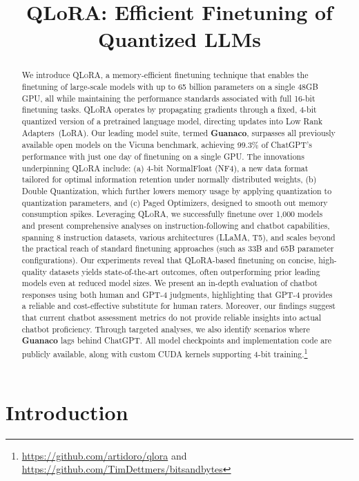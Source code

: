 \title{QLoRA: Efficient Finetuning of Quantized LLMs}

\begin{abstract}
We introduce \textsc{QLoRA}, a memory-efficient finetuning technique that enables the finetuning of large-scale models with up to 65 billion parameters on a single 48GB GPU, all while maintaining the performance standards associated with full 16-bit finetuning tasks. \textsc{QLoRA} operates by propagating gradients through a fixed, 4-bit quantized version of a pretrained language model, directing updates into Low Rank Adapters~(LoRA). Our leading model suite, termed \textbf{Guanaco}, surpasses all previously available open models on the Vicuna benchmark, achieving 99.3\% of ChatGPT’s performance with just one day of finetuning on a single GPU. The innovations underpinning \textsc{QLoRA} include: (a) 4-bit NormalFloat (NF4), a new data format tailored for optimal information retention under normally distributed weights, (b) Double Quantization, which further lowers memory usage by applying quantization to quantization parameters, and (c) Paged Optimizers, designed to smooth out memory consumption spikes. Leveraging \textsc{QLoRA}, we successfully finetune over 1,000 models and present comprehensive analyses on instruction-following and chatbot capabilities, spanning 8 instruction datasets, various architectures (LLaMA, T5), and scales beyond the practical reach of standard finetuning approaches (such as 33B and 65B parameter configurations). Our experiments reveal that QLoRA-based finetuning on concise, high-quality datasets yields state-of-the-art outcomes, often outperforming prior leading models even at reduced model sizes. We present an in-depth evaluation of chatbot responses using both human and GPT-4 judgments, highlighting that GPT-4 provides a reliable and cost-effective substitute for human raters. Moreover, our findings suggest that current chatbot assessment metrics do not provide reliable insights into actual chatbot proficiency. Through targeted analyses, we also identify scenarios where \textbf{Guanaco} lags behind ChatGPT. All model checkpoints and implementation code are publicly available, along with custom CUDA kernels supporting 4-bit training.\footnote{\url{https://github.com/artidoro/qlora} and \url{https://github.com/TimDettmers/bitsandbytes}}
\end{abstract}

\section{Introduction}

